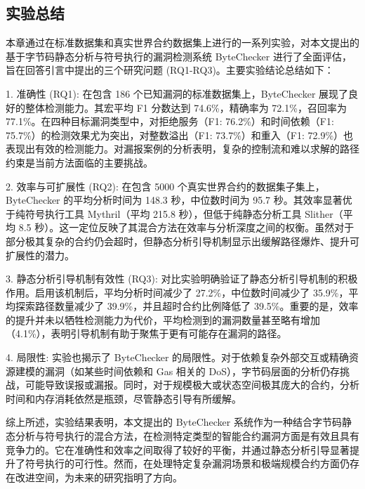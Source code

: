 \documentclass[print, master, vlined, timesmath]{DissertUESTC}
\begin{document}
\subsection{实验总结}

本章通过在标准数据集和真实世界合约数据集上进行的一系列实验，对本文提出的基于字节码静态分析与符号执行的漏洞检测系统 ByteChecker 进行了全面评估，旨在回答引言中提出的三个研究问题 (RQ1-RQ3)。主要实验结论总结如下：

1.  准确性 (RQ1): 在包含 186 个已知漏洞的标准数据集上，ByteChecker 展现了良好的整体检测能力。其宏平均 F1 分数达到 74.6\%，精确率为 72.1\%，召回率为 77.1\%。在四种目标漏洞类型中，对拒绝服务（F1: 76.2\%）和时间依赖（F1: 75.7\%）的检测效果尤为突出，对整数溢出（F1: 73.7\%）和重入（F1: 72.9\%）也表现出有效的检测能力。对漏报案例的分析表明，复杂的控制流和难以求解的路径约束是当前方法面临的主要挑战。

2.  效率与可扩展性 (RQ2): 在包含 5000 个真实世界合约的数据集子集上，ByteChecker 的平均分析时间为 148.3 秒，中位数时间为 95.7 秒。其效率显著优于纯符号执行工具 Mythril（平均 215.8 秒），但低于纯静态分析工具 Slither（平均 8.5 秒）。这一定位反映了其混合方法在效率与分析深度之间的权衡。虽然对于部分极其复杂的合约仍会超时，但静态分析引导机制显示出缓解路径爆炸、提升可扩展性的潜力。

3.  静态分析引导机制有效性 (RQ3): 对比实验明确验证了静态分析引导机制的积极作用。启用该机制后，平均分析时间减少了 27.2\%，中位数时间减少了 35.9\%，平均探索路径数量减少了 39.9\%，并且超时合约比例降低了 39.5\%。重要的是，效率的提升并未以牺牲检测能力为代价，平均检测到的漏洞数量甚至略有增加（4.1\%），表明引导机制有助于聚焦于更有可能存在漏洞的路径。

4.  局限性: 实验也揭示了 ByteChecker 的局限性。对于依赖复杂外部交互或精确资源建模的漏洞（如某些时间依赖和 Gas 相关的 DoS），字节码层面的分析仍存挑战，可能导致误报或漏报。同时，对于规模极大或状态空间极其庞大的合约，分析时间和内存消耗依然是瓶颈，尽管静态引导有所缓解。

综上所述，实验结果表明，本文提出的 ByteChecker 系统作为一种结合字节码静态分析与符号执行的混合方法，在检测特定类型的智能合约漏洞方面是有效且具有竞争力的。它在准确性和效率之间取得了较好的平衡，并通过静态分析引导显著提升了符号执行的可行性。然而，在处理特定复杂漏洞场景和极端规模合约方面仍存在改进空间，为未来的研究指明了方向。
\end{document}
